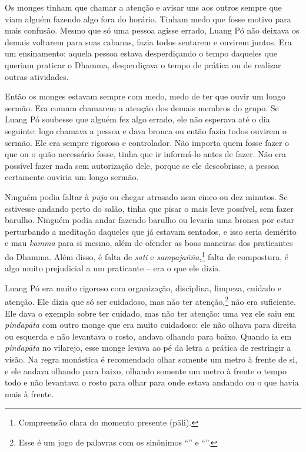 Os monges tinham que chamar a atenção e avisar uns aos outros sempre que
viam alguém fazendo algo fora do horário. Tinham medo que fosse motivo
para mais confusão. Mesmo que só uma pessoa agisse errado, Luang Pó não
deixava os demais voltarem para suas cabanas, fazia todos sentarem e
ouvirem juntos. Era um ensinamento: aquela pessoa estava desperdiçando o
tempo daqueles que queriam praticar o Dhamma, desperdiçava o tempo de
prática ou de realizar outras atividades.

Então os monges estavam sempre com medo, medo de ter que ouvir um longo
sermão. Era comum chamarem a atenção dos demais membros do grupo. Se
Luang Pó soubesse que alguém fez algo errado, ele não esperava até o dia
seguinte: logo chamava a pessoa e dava bronca ou então fazia todos
ouvirem o sermão. Ele era sempre rigoroso e controlador. Não importa
quem fosse fazer o que ou o quão necessário fosse, tinha que ir
informá-lo antes de fazer. Não era possível fazer nada sem autorização
dele, porque se ele descobrisse, a pessoa certamente ouviria um longo
sermão.

Ninguém podia faltar à \emph{pūja} ou chegar atrasado nem cinco ou dez
minutos. Se estivesse andando perto do salão, tinha que pisar o mais
leve possível, sem fazer barulho. Ninguém podia andar fazendo barulho ou
levaria uma bronca por estar perturbando a meditação daqueles que já
estavam sentados, e isso seria demérito e mau \emph{kamma} para si
mesmo, além de ofender as boas maneiras dos praticantes do Dhamma. Além
disso, é falta de \emph{sati} e \emph{sampajañña},\footnote{Compreensão
  clara do momento presente (pāli).} falta de compostura, é algo muito
prejudicial a um praticante -- era o que ele dizia.

Luang Pó era muito rigoroso com organização, disciplina, limpeza,
cuidado e atenção. Ele dizia que só ser cuidadoso, mas não ter
atenção,\footnote{Esse é um jogo de palavras com os sinônimos ``'' e
  ``''.} não era suficiente. Ele dava o exemplo sobre ter cuidado,
mas não ter atenção: uma vez ele saiu em \emph{pindapāta} com outro
monge que era muito cuidadoso: ele não olhava para direita ou esquerda e
não levantava o rosto, andava olhando para baixo. Quando ia em
\emph{pindapāta} no vilarejo, esse monge levava ao pé da letra a prática
de restringir a visão. Na regra monástica é recomendado olhar somente um
metro à frente de si, e ele andava olhando para baixo, olhando somente
um metro à frente o tempo todo e não levantava o rosto para olhar para
onde estava andando ou o que havia mais à frente.

